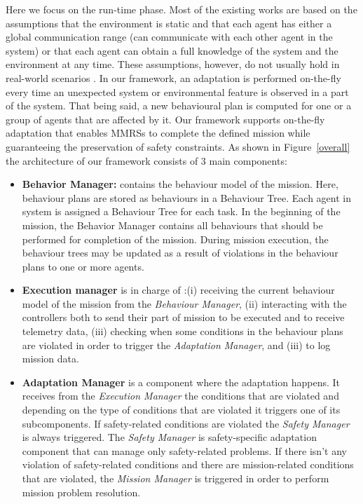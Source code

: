 \documentclass[journal]{IEEEtran}
\theoremstyle{definition}
\begin{document}
Here we focus on the run-time phase.
Most of the existing works are based on the assumptions that the environment is static and that each agent has either a global communication range (can communicate with each other agent in the system) or that each agent can obtain a full knowledge of the system and the environment at any time. These
assumptions, however, do not usually hold in real-world scenarios \cite{lahijanian2016iterative}.
In our framework, an adaptation is performed on-the-fly every time an unexpected system or environmental feature is observed in a part of the system. That being said, a new behavioural plan is computed for one or a group of agents that are affected by it. Our framework supports on-the-fly adaptation that enables MMRSs to complete the defined mission while guaranteeing the preservation of safety constraints. As shown in Figure~\ref{overall} the architecture of our framework consists of 3 main components:
\begin{itemize}
    \item \textbf{Behavior Manager:} contains the behaviour model of the mission. Here, behaviour plans are stored as behaviours in a Behaviour Tree. Each agent in system is assigned a Behaviour Tree for each task. In the beginning of the mission, the Behavior Manager contains all behaviours that should be performed for completion of the mission. During mission execution, the  behaviour trees may be updated as a result of violations in the behaviour plans to one or more agents.
    \item \textbf{Execution manager} is in charge of :(i) receiving the current behaviour model of the mission from the \textit{Behaviour Manager},
    (ii) interacting
    with the controllers both to send their part of mission to be
    executed and to receive telemetry data,
    (iii) checking when some conditions in the behaviour plans are violated in order to trigger the \textit{Adaptation Manager}, and (iii) to log mission data.
    
    \item \textbf{Adaptation Manager} is a component where the adaptation happens. 
    It receives from the \textit{Execution Manager} the conditions that are violated and
    depending on the type of conditions that are violated it triggers one of its subcomponents. If safety-related conditions are violated the \textit{Safety Manager}  is always triggered. The \textit{Safety Manager} is safety-specific adaptation component that can manage only safety-related problems. If there isn't any violation of safety-related conditions and there are mission-related conditions that are violated, the \textit{Mission Manager} is triggered in order to perform mission problem resolution.
\end{itemize}
\end{document}
